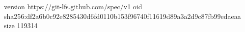 version https://git-lfs.github.com/spec/v1
oid sha256:df2a6b0c92e8285430d6fd0110b153f96740f11619d89a3a2d9c87fb99edaeaa
size 119314
